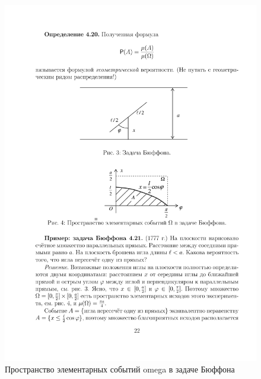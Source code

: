 \begin{figure}[h!]
	\centering
	\includegraphics[]{pic/pic4}
	\caption{Пространство элементарных событий omega в задаче Бюффона}
	\label{fig4}
\end{figure}

